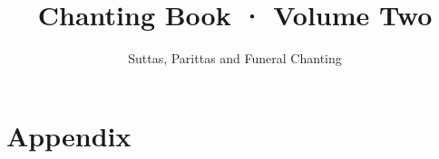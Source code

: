 \documentclass[
  babelLanguage=english,
  final,
]{chantingbook}
\title{Chanting Book · Volume Two}
\subtitle{Suttas, Parittas and Funeral Chanting}
\begin{document}


\frontmatter
\openany

\cleartoverso


\cleartorecto
\tableofcontents*



\cleartorecto
\listfirstlines*

\mainmatter



\part{Appendix}

\appendixsize





\cleartorecto

\end{document}
